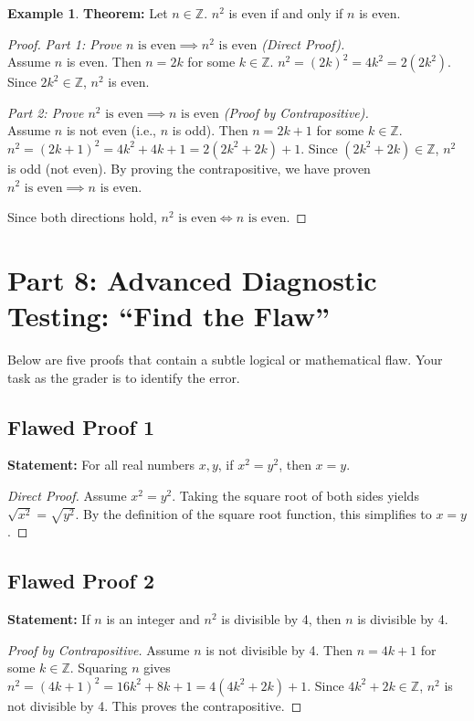 \documentclass[11pt, a4paper]{article}
\theoremstyle{definition}
\newtheorem{example}{Example}[section]
\theoremstyle{remark}
\newcommand{\Z}{\mathbb{Z}}
\begin{document}
\begin{example}
\textbf{Theorem:} Let $n \in \Z$. $n^2$ is even if and only if $n$ is even.

\begin{proof}
\textit{Part 1: Prove $n \text{ is even} \implies n^2 \text{ is even}$ (Direct Proof).} \\
Assume $n$ is even. Then $n = 2k$ for some $k \in \Z$. 
$n^2 = (2k)^2 = 4k^2 = 2(2k^2)$. Since $2k^2 \in \Z$, $n^2$ is even.

\textit{Part 2: Prove $n^2 \text{ is even} \implies n \text{ is even}$ (Proof by Contrapositive).} \\
Assume $n$ is not even (i.e., $n$ is odd). Then $n = 2k+1$ for some $k \in \Z$.
$n^2 = (2k+1)^2 = 4k^2 + 4k + 1 = 2(2k^2 + 2k) + 1$. 
Since $(2k^2 + 2k) \in \Z$, $n^2$ is odd (not even). 
By proving the contrapositive, we have proven $n^2 \text{ is even} \implies n \text{ is even}$.

Since both directions hold, $n^2 \text{ is even} \iff n \text{ is even}$.
\end{proof}
\end{example}

\section{Part 8: Advanced Diagnostic Testing: ``Find the Flaw''}

Below are five proofs that contain a subtle logical or mathematical flaw. Your task as the grader is to identify the error.

\subsection{Flawed Proof 1}
\textbf{Statement:} For all real numbers $x, y$, if $x^2 = y^2$, then $x = y$.
\begin{proof}[Direct Proof]
Assume $x^2 = y^2$. Taking the square root of both sides yields $\sqrt{x^2} = \sqrt{y^2}$. By the definition of the square root function, this simplifies to $x = y$.
\end{proof}

\subsection{Flawed Proof 2}
\textbf{Statement:} If $n$ is an integer and $n^2$ is divisible by 4, then $n$ is divisible by 4.
\begin{proof}[Proof by Contrapositive]
Assume $n$ is not divisible by 4. Then $n = 4k + 1$ for some $k \in \Z$. 
Squaring $n$ gives $n^2 = (4k+1)^2 = 16k^2 + 8k + 1 = 4(4k^2 + 2k) + 1$. 
Since $4k^2 + 2k \in \Z$, $n^2$ is not divisible by 4. This proves the contrapositive.
\end{proof}
\end{document}
